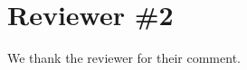 \section{Reviewer \#2}
\begin{comment}[*]
Knight et al. present a systematic scoping review addressing the impact of risk heterogeneity representation on the estimated impact of antiretroviral therapy to reduce HIV transmission in sub-Saharan Africa. They find a range of risk heterogeneity model paramaterisation, in turn leading to substantial variation in the estimated reduction of HIV incidence/new infections attributable to ART. This represents a significant consolidation exercise and represents a timely and valuable addition to the literature as interest in risk heterogeneity in sub-Saharan Africa, including representation of key populations, increases.
\end{comment}
\begin{response}
We thank the reviewer for their comment.
\end{response}
